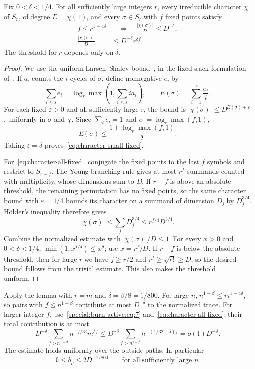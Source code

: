 \begin{lemma}\label{lem:character-fixed-points}\label{input:character}
Fix $0<\delta<1/4$. For all sufficiently large integers $r$, every irreducible character $\chi$ of $S_r$, of degree $D=\chi(1)$, and every $\sigma\in S_r$ with $f$ fixed points satisfy
\begin{align}
 f\le r^{1-4\delta}&\quad\Longrightarrow\quad
       \frac{|\chi(\sigma)|}{D}\le D^{-\delta},\label{eq:character-small-fixed}\\
 \frac{|\chi(\sigma)|}{D}&\le D^{-\delta}r^{\delta f}.\label{eq:character-all-fixed}
\end{align}
The threshold for $r$ depends only on $\delta$.
\end{lemma}
\begin{proof}
We use the uniform Larsen--Shalev bound~\cite[Theorem~1.1]{larsen-shalev2008}, in the fixed-slack formulation of~\cite[Definition~2.1 and Theorem~2.2]{keller-lifshitz-sheinfeld2024}. If $a_i$ counts the $i$-cycles of $\sigma$, define nonnegative $e_i$ by
\[
 \sum_{i\le s}e_i=\log_r\max\left(1,\sum_{i\le s}i a_i\right),
 \qquad E(\sigma)=\sum_{i=1}^r\frac{e_i}{i}.
\]
For each fixed $\varepsilon>0$ and all sufficiently large $r$, the bound is $|\chi(\sigma)|\le D^{E(\sigma)+\varepsilon}$, uniformly in $\sigma$ and $\chi$. Since $\sum_i e_i=1$ and $e_1=\log_r\max(f,1)$,
\[
 E(\sigma)\le\frac{1+\log_r\max(f,1)}2.
\]
Taking $\varepsilon=\delta$ proves~\eqref{eq:character-small-fixed}.

For~\eqref{eq:character-all-fixed}, conjugate the fixed points to the last $f$ symbols and restrict to $S_{r-f}$. The Young branching rule gives at most $r^f$ summands counted with multiplicity, whose dimensions sum to $D$. If $r-f$ is above an absolute threshold, the remaining permutation has no fixed points, so the same character bound with $\varepsilon=1/4$ bounds its character on a summand of dimension $D_j$ by $D_j^{3/4}$. H\"older's inequality therefore gives
\[
 |\chi(\sigma)|\le \sum_j D_j^{3/4}
       \le r^{f/4}D^{3/4}.
\]
Combine the normalized estimate with $|\chi(\sigma)|/D\le1$. For every $x>0$ and $0<\delta<1/4$, $\min(1,x^{1/4})\le x^\delta$; use $x=r^f/D$. If $r-f$ is below the absolute threshold, then for large $r$ we have $f\ge r/2$ and $r^f\ge\sqrt{r!}\ge D$, so the desired bound follows from the trivial estimate. This also makes the threshold uniform.
\end{proof}

Apply the lemma with $r=m$ and $\delta=\beta/8=1/800$. For large $n$, $n^{1-\beta}\le m^{1-4\delta}$, so pairs with $f\le n^{1-\beta}$ contribute at most $D^{-\delta}$ to the normalized trace. For larger integer $f$, use~\eqref{special:burn-active:eq:7} and~\eqref{eq:character-all-fixed}; their total contribution is at most
\[
 D^{-\delta}\sum_{f>n^{1-\beta}}n^{-f/32}m^{\delta f}
 \le D^{-\delta}\sum_{f>n^{1-\beta}}n^{-(1/32-\delta)f}
 =o(1)D^{-\delta}.
\]
The estimate holds uniformly over the outside paths. In particular
\begin{equation}
 0\le b_\rho\le 2D^{-1/800}
 \qquad\text{for all sufficiently large }n.\label{special:burn-active:eq:8}
\end{equation}

